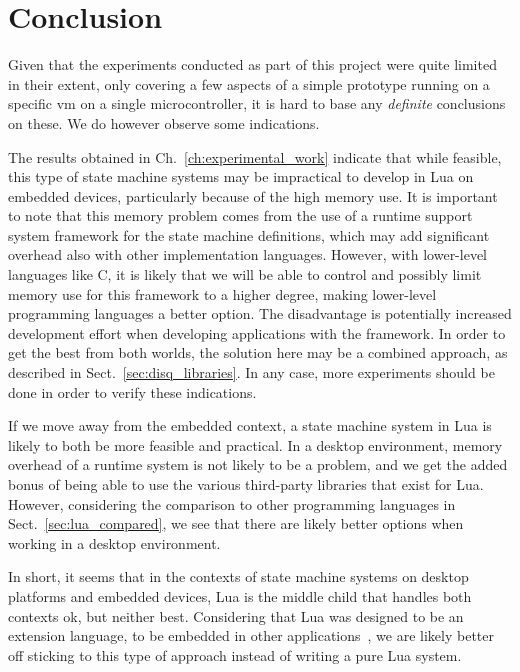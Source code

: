 \section{Conclusion}
\label{sec:conclusion}
Given that the experiments conducted as part of this project were quite limited in their extent, only covering a few aspects of a simple prototype running on a specific \gls{vm} on a single microcontroller, it is hard to base any \emph{definite} conclusions on these. We do however observe some indications.

\noindent
The results obtained in Ch.~\ref{ch:experimental_work} indicate that while feasible, this type of state machine systems may be impractical to develop in Lua on embedded devices, particularly because of the high memory use. It is important to note that this memory problem comes from the use of a runtime support system framework for the state machine definitions, which may add significant overhead also with other implementation languages. However, with lower-level languages like C, it is likely that we will be able to control and possibly limit memory use for this framework to a higher degree, making lower-level programming languages a better option. The disadvantage is potentially increased development effort when developing applications with the framework. In order to get the best from both worlds, the solution here may be a combined approach, as described in Sect.~\ref{sec:disq_libraries}. In any case, more experiments should be done in order to verify these indications.

\noindent
If we move away from the embedded context, a state machine system in Lua is likely to both be more feasible and practical. In a desktop environment, memory overhead of a runtime system is not likely to be a problem, and we get the added bonus of being able to use the various third-party libraries that exist for Lua. However, considering the comparison to other programming languages in Sect.~\ref{sec:lua_compared}, we see that there are likely better options when working in a desktop environment.

\noindent
In short, it seems that in the contexts of state machine systems on desktop platforms and embedded devices, Lua is the middle child that handles both contexts ok, but neither best. Considering that Lua was designed to be an extension language, to be embedded in other applications~\cite{article:the_implementation_of_lua}, we are likely better off sticking to this type of approach instead of writing a pure Lua system.

